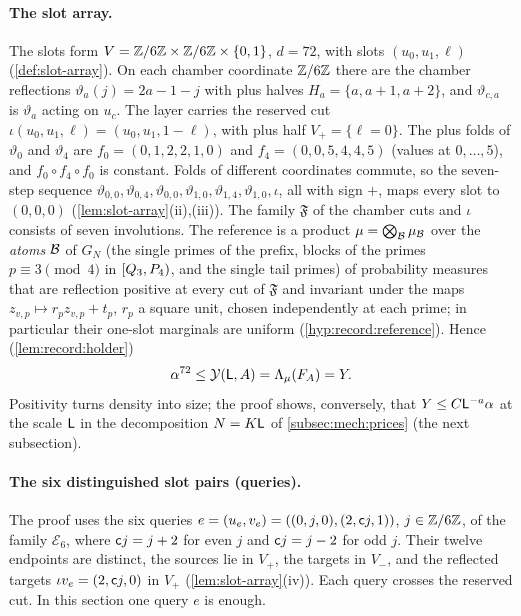 \paragraph{The slot array.}
The slots form $V=\mathbb Z/6\mathbb Z\times\mathbb Z/6\mathbb Z\times\{0,1\}$, $d=72$, with slots
$(u_0,u_1,\ell)$ (\cref{def:slot-array}). On each chamber coordinate $\mathbb Z/6\mathbb Z$
there are the chamber reflections $\vartheta_a(j)=2a-1-j$ with plus halves
$H_a=\{a,a+1,a+2\}$, and $\vartheta_{c,a}$ is $\vartheta_a$ acting on $u_c$. The
layer carries the reserved cut $\iota(u_0,u_1,\ell)=(u_0,u_1,1-\ell)$, with plus
half $V_+=\{\ell=0\}$. The plus folds of $\vartheta_0$ and $\vartheta_4$ are
$f_0=(0,1,2,2,1,0)$ and $f_4=(0,0,5,4,4,5)$ (values at $0,\dots,5$), and
$f_0\circ f_4\circ f_0$ is constant. Folds of different coordinates commute,
so the seven-step sequence
$\vartheta_{0,0},\vartheta_{0,4},\vartheta_{0,0},\vartheta_{1,0},\vartheta_{1,4},
\vartheta_{1,0},\iota$, all with sign $+$, maps every slot to $(0,0,0)$
(\cref{lem:slot-array}(ii),(iii)). The family $\mathfrak F$ of the chamber
cuts and $\iota$ consists of seven involutions. The reference is a product
$\mu=\bigotimes_\mathcal B\mu_\mathcal B$ over the \emph{atoms} $\mathcal B$ of $G_N$ (the single
primes of the prefix, blocks of the primes $p\equiv3\pmod4$ in
$[Q_3,P_4)$, and the single tail primes) of probability measures that are
reflection positive at every cut of $\mathfrak F$ and invariant under the maps
$z_{v,p}\mapsto r_pz_{v,p}+t_p$, $r_p$ a square unit, chosen independently at
each prime; in particular their one-slot marginals are uniform
(\cref{hyp:record:reference}). Hence (\cref{lem:record:holder})
\begin{equation}\label{eq:mech:density}
 \alpha^{72}\le\mathcal Y(\mathsf L,A)=\Lambda_\mu(F_A)=Y .
\end{equation}
Positivity turns density into size; the proof shows, conversely, that
$Y\le C\mathsf L^{-a}\alpha$ at the scale $\mathsf L$ in the decomposition
$N=K\mathsf L$ of \cref{subsec:mech:prices} (the next subsection).

\paragraph{The six distinguished slot pairs (queries).}
The proof uses the six queries $e=(u_e,v_e)=((0,j,0),(2,\mathsf c j,1))$,
$j\in\mathbb Z/6\mathbb Z$, of the family $\mathcal E_6$, where $\mathsf c j=j+2$ for even $j$ and
$\mathsf c j=j-2$ for odd $j$. Their twelve
endpoints are distinct, the sources lie in $V_+$, the targets in $V_-$, and
the reflected targets $\iota v_e=(2,\mathsf c j,0)$ in $V_+$
(\cref{lem:slot-array}(iv)). Each query crosses the reserved cut. In this
section one query $e$ is enough.

